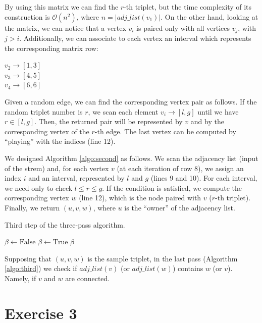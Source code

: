 \documentclass[12pt,a4paper]{article}
\begin{document}
By using this matrix we can find the $r$-th triplet, but the time complexity of its construction is $\mathcal{O}(n^2)$, where $n = |adj\_list(v_1)|$. On the other hand, looking at the matrix, we can notice that a vertex $v_i$ is paired only with all vertices $v_j$, with $j > i$. Additionally, we can associate to each vertex an interval which represents the corresponding matrix row:
\begin{center}
$v_2 \rightarrow [1, 3]$\\
$v_3 \rightarrow [4, 5]$\\
$v_4 \rightarrow [6, 6]$
\end{center}

Given a random edge, we can find the corresponding vertex pair as follows. If the random triplet number is $r$, we scan each element $v_i \rightarrow [l, g]$ until we have $r \in [l, g]$. Then, the returned pair will be represented by $v$ and by the corresponding vertex of the $r$-th edge. The last vertex can be computed by ``playing'' with the indices (line 12).

We designed Algorithm \ref{algo:second} as follows. We scan the adjacency list (input of the strem) and, for each vertex $v$ (at each iteration of row 8), we assign an index $i$ and an interval, represented by $l$ and $g$ (lines 9 and 10). For each interval, we need only to check $l \leq r \leq g$. If the condition is satisfied, we compute the corresponding vertex $w$ (line 12), which is the node paired with $v$ ($r$-th triplet). Finally, we return $(u, v, w)$, where $u$ is the ``owner'' of the adjacency list.




\begin{algorithm}
\caption{Third step of the three-pass algorithm.}\label{algo:third}
\begin{algorithmic}[1]
\State $\beta \gets \text{False}$
\State $\beta \gets \text{True}$
    \EndIf
\EndFor
\State \Return $\beta$
\EndFunction
\end{algorithmic}
\end{algorithm}

Supposing that $(u, v, w)$ is the sample triplet, in the last pass (Algorithm \ref{algo:third}) we check if $adj\_list(v)$ (or $adj\_list(w)$) contains $w$ (or $v$). Namely, if $v$ and $w$ are connected.


\section*{Exercise 3}
\end{document}
